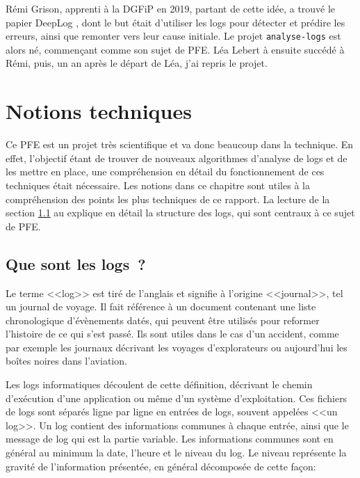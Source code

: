 \documentclass[openany, 11pt]{memoir}
\begin{document}
Rémi Grison, apprenti à la DGFiP en 2019, partant de cette idée, a trouvé le papier DeepLog \cite{deeplog}, dont le but était d'utiliser les logs pour détecter et prédire les erreurs, ainsi que remonter vers leur cause initiale. Le projet \texttt{analyse-logs} est alors né, commençant comme son sujet de PFE. Léa Lebert à ensuite succédé à Rémi, puis, un an après le départ de Léa, j'ai repris le projet.

\newpage
\chapter{Notions techniques}

Ce PFE est un projet très scientifique et va donc beaucoup dans la technique. En effet, l'objectif étant de trouver de nouveaux algorithmes d'analyse de \glspl{log} et de les mettre en place, une compréhension en détail du fonctionnement de ces techniques était nécessaire. Les notions dans ce chapitre sont utiles à la compréhension des points les plus techniques de ce rapport. La lecture de la section \ref{logs} au explique en détail la structure des logs, qui sont centraux à ce sujet de PFE.

\section{Que sont les logs~?}
\label{logs}

Le terme <<log>> est tiré de l'anglais et signifie à l'origine <<journal>>, tel un journal de voyage. Il fait référence à un document contenant une liste chronologique d'évènements datés, qui peuvent être utilisés pour reformer l'histoire de ce qui s'est passé. Ils sont utiles dans le cas d'un accident, comme par exemple les journaux décrivant les voyages d'explorateurs ou aujourd'hui les boîtes noires dans l'aviation.

Les logs informatiques découlent de cette définition, décrivant le chemin d'exécution d'une application ou même d'un système d'exploitation. Ces fichiers de logs sont séparés ligne par ligne en entrées de logs, souvent appelées <<un log>>. Un log contient des informations communes à chaque entrée, ainsi que le message de log qui est la partie variable. Les informations communes sont en général au minimum la date, l'heure et le niveau du log. Le niveau représente la gravité de l'information présentée, en général décomposée de cette façon:
\end{document}
